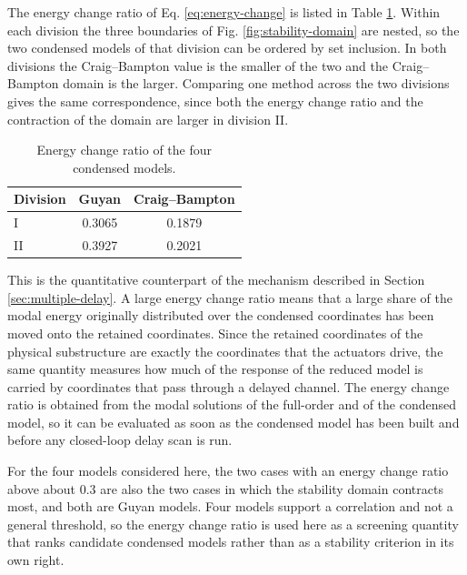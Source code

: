 \documentclass[11pt,a4paper]{article}
\numberwithin{equation}{section}
\begin{document}
The energy change ratio of Eq. \eqref{eq:energy-change} is listed in Table \ref{tab:energy}. Within each division the three boundaries of Fig. \ref{fig:stability-domain} are nested, so the two condensed models of that division can be ordered by set inclusion. In both divisions the Craig--Bampton value is the smaller of the two and the Craig--Bampton domain is the larger. Comparing one method across the two divisions gives the same correspondence, since both the energy change ratio and the contraction of the domain are larger in division II.

\begin{table}[htbp]
	\centering
	\caption{Energy change ratio of the four condensed models.}
	\label{tab:energy}
	\begin{tabular}{lcc}
		\toprule
		Division & Guyan & Craig--Bampton\\
		\midrule
		I  & 0.3065 & 0.1879\\
		II & 0.3927 & 0.2021\\
		\bottomrule
	\end{tabular}
\end{table}

This is the quantitative counterpart of the mechanism described in Section \ref{sec:multiple-delay}. A large energy change ratio means that a large share of the modal energy originally distributed over the condensed coordinates has been moved onto the retained coordinates. Since the retained coordinates of the physical substructure are exactly the coordinates that the actuators drive, the same quantity measures how much of the response of the reduced model is carried by coordinates that pass through a delayed channel. The energy change ratio is obtained from the modal solutions of the full-order and of the condensed model, so it can be evaluated as soon as the condensed model has been built and before any closed-loop delay scan is run.

For the four models considered here, the two cases with an energy change ratio above about 0.3 are also the two cases in which the stability domain contracts most, and both are Guyan models. Four models support a correlation and not a general threshold, so the energy change ratio is used here as a screening quantity that ranks candidate condensed models rather than as a stability criterion in its own right.
\end{document}
